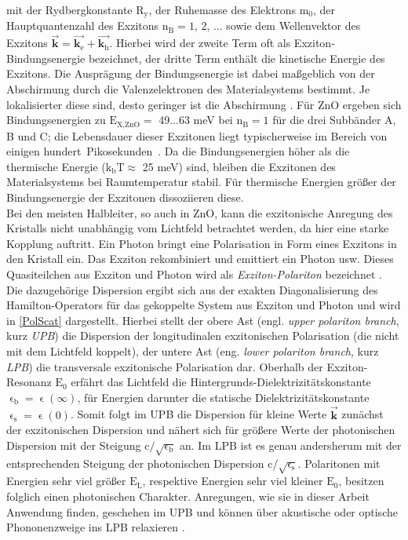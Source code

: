 mit der Rydbergkonstante $\text{R}_\text{y}$, der Ruhemasse des Elektrons $\text{m}_\text{0}$, der Hauptquantenzahl des Exzitons $\text{n}_\text{B}= \text{1, 2, }\ldots $ sowie dem Wellenvektor des Exzitons $\vec{\textbf{k}}= \vec{\textbf{k$_\text{e}$}}+\vec{\textbf{k$_\text{h}$}}$. Hierbei wird der zweite Term oft als Exziton-Bindungsenergie bezeichnet, der dritte Term enthält die kinetische Energie des Exzitons. Die Ausprägung der Bindungsenergie ist dabei \mbox{maßgeblich} von der Abschirmung durch die Valenzelektronen des \mbox{Materialsystems} bestimmt. Je lokalisierter diese sind, desto geringer ist die Abschirmung \cite{Dvorak.2013}. Für ZnO ergeben sich  Bindungsenergien zu $\text{E}_\text{X,ZnO}=$ 49$\ldots$63 meV \cite{Mang.1995} bei $\text{n}_\text{B}= \text{1}$ für die drei \mbox{Subbänder} A, B und C; die Lebensdauer dieser Exzitonen liegt typischerweise im Bereich von einigen \mbox{hundert Pikosekunden \cite{Zhang.2007}}. Da die Bindungsenergien höher als die thermische Energie ($\text{k}_\text{b}\text{T} \approx$ 25 meV) sind, bleiben die Exzitonen des Materialsystems bei \mbox{Raumtemperatur} stabil. Für thermische Energien größer der Bindungsenergie der Exzitonen dissoziieren diese.\\
Bei den meisten Halbleiter, so auch in ZnO, kann die exzitonische Anregung des \mbox{Kristalls} nicht unabhängig vom Lichtfeld betrachtet werden, da hier eine starke \mbox{Kopplung} \mbox{auftritt}. Ein Photon bringt eine Polarisation in Form eines Exzitons in den Kristall ein. Das \mbox{Exziton} rekombiniert und emittiert ein Photon usw. Dieses Quasiteilchen aus Exziton und Photon wird als \textit{Exziton-Polariton} bezeichnet \cite{Hopfield.1958}. Die dazugehörige \mbox{Dispersion} ergibt sich aus der exakten Diagonalisierung des Hamilton-Operators für das gekoppelte System aus Exziton und Photon und wird in \autoref{PolScat} dargestellt. Hierbei stellt der obere Ast (engl. \textit{upper polariton branch}, kurz \textit{UPB}) die Dispersion der longitudinalen exzitonischen Polarisation (die nicht mit dem \mbox{Lichtfeld} koppelt), der untere Ast (eng. \textit{lower polariton branch}, kurz \textit{LPB}) die \mbox{transversale} \mbox{exzitonische} \mbox{Polarisation} dar. Oberhalb der Exziton-Resonanz $\text{E}_\text{0}$ erfährt das \mbox{Lichtfeld} die Hintergrunds-Dielektrizitätskonstante $\upvarepsilon _\text{b}=\upvarepsilon (\infty)$, für Energien darunter die \mbox{statische} Dielektrizitätskonstante $\upvarepsilon _\text{s}=\upvarepsilon (\text{0})$. Somit folgt im UPB die Dispersion für \mbox{kleine} \mbox{Werte} $\vec{\textbf{k}}$ zunächst der exzitonischen Dispersion und nähert sich für größere Werte der \mbox{photonischen} Dispersion mit der Steigung $\text{c}/\sqrt{\upvarepsilon _\text{b}}$ an. Im LPB ist es genau \mbox{andersherum} mit der entsprechenden Steigung der photonischen Dispersion $\text{c}/\sqrt{\upvarepsilon _\text{s}}$. Polaritonen mit Energien sehr viel größer $\text{E}_\text{L}$, respektive Energien sehr viel kleiner $\text{E}_\text{0}$, besitzen folglich einen photonischen Charakter. Anregungen, wie sie in dieser Arbeit Anwendung finden, geschehen im UPB und können über akustische oder optische Phononenzweige ins LPB relaxieren \cite{Klingshirn.2007}.\\
